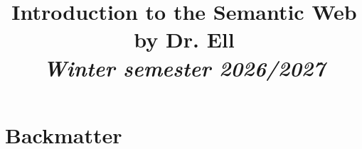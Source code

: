 
\usepackage[ngerman]{babel}







\title{Introduction to the Semantic Web \\ \small{by Dr. Ell} \\ \textit{\footnotesize{Winter semester 2026/2027} } }

\newcommand\reporttitle{Lecture Introduction to the Semantic Web}
\newcommand\reportsubtitle{Winter semester 2026/2027}
\newcommand\profs{Vorlesung von Dr. Ell}
\newcommand\reportsubsubtitle{Lecture and study notes}
\newcommand\reportauthors{
    \textbf{Liliana Sanfilippo}
}


    \frontmatter
    
    {\hypersetup{linkcolor=black} %
    \tableofcontents\thispagestyle{empty}}
    \newpage

    \mainmatter

    



    \backmatter


    \chapter{Backmatter}\label{ch:backmatter}

    \listoffigures

    \printindex

    \printglossary[type=defi, title=Definitions]



